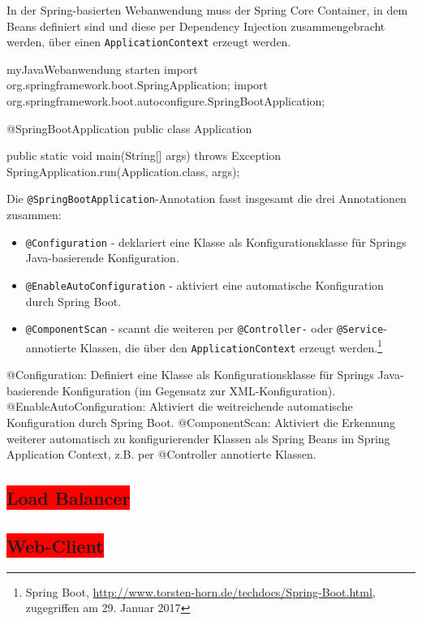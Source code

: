 %
In der Spring-basierten Webanwendung muss der Spring Core Container, in dem Beans definiert sind und diese per Dependency Injection zusammengebracht werden, über einen \texttt{ApplicationContext} erzeugt werden.
\begin{listingsboxJava}[label={lst:X}]{myJava}{Webanwendung starten}
import org.springframework.boot.SpringApplication;
import org.springframework.boot.autoconfigure.SpringBootApplication;

@SpringBootApplication
public class Application {

    public static void main(String[] args) throws Exception {
        SpringApplication.run(Application.class, args);
    }
}
\end{listingsboxJava}
Die \texttt{@SpringBootApplication}-Annotation fasst insgesamt die drei Annotationen zusammen:
\begin{itemize}

\item \texttt{@Configuration} - deklariert eine Klasse als Konfigurationsklasse für Springs Java-basierende Konfiguration.
\item \texttt{@EnableAutoConfiguration} - aktiviert eine automatische Konfiguration durch Spring Boot.
\item \texttt{@ComponentScan} - scannt die weiteren per \texttt{@Controller-} oder \texttt{@Service}- annotierte Klassen, die über den \texttt{ApplicationContext} erzeugt werden.\footnote{Spring Boot, \url{http://www.torsten-horn.de/techdocs/Spring-Boot.html}, zugegriffen am 29. Januar 2017}

\end{itemize}

@Configuration: Definiert eine Klasse als Konfigurationsklasse für Springs Java-basierende Konfiguration (im Gegensatz zur XML-Konfiguration).
@EnableAutoConfiguration: Aktiviert die weitreichende automatische Konfiguration durch Spring Boot.
@ComponentScan: Aktiviert die Erkennung weiterer automatisch zu konfigurierender Klassen als Spring Beans im Spring Application Context, z.B. per @Controller annotierte Klassen.

\subsection{\colorbox{red}{Load Balancer}}

\subsection{\colorbox{red}{Web-Client}}



